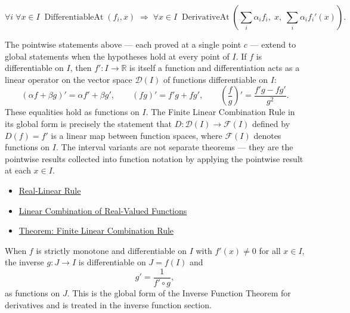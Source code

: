 \begin{remark*}
\[
\forall i\;\forall x\in I\;\operatorname{DifferentiableAt}(f_i,x)
\;\Rightarrow\;
\forall x\in I\;\operatorname{DerivativeAt}\!\left(\textstyle\sum_i\alpha_i f_i,\;x,\;\textstyle\sum_i\alpha_i f_i'(x)\right).
\]
\end{remark*}

\begin{remark*}[Interpretation]
The pointwise statements above --- each proved at a single point $c$ --- extend to global statements when the hypotheses hold at every point of $I$. If $f$ is differentiable on $I$, then $f' : I \to \mathbb{R}$ is itself a function and differentiation acts as a linear operator on the vector space $\mathcal{D}(I)$ of functions differentiable on $I$:
\[
  (\alpha f + \beta g)' = \alpha f' + \beta g',\qquad
  (fg)' = f'g + fg',\qquad
  \left(\frac{f}{g}\right)' = \frac{f'g - fg'}{g^2}.
\]
These equalities hold as functions on $I$. The Finite Linear Combination Rule in its global form is precisely the statement that $D : \mathcal{D}(I) \to \mathcal{F}(I)$ defined by $D(f) = f'$ is a linear map between function spaces, where $\mathcal{F}(I)$ denotes functions on $I$. The interval variants are not separate theorems --- they are the pointwise results collected into function notation by applying the pointwise result at each $x \in I$.
\end{remark*}

\begin{dependencies}
\begin{itemize}
  \item \hyperref[def:real-linear-rule]{Real-Linear Rule}
  \item \hyperref[def:linear-combination-of-real-valued-functions]{Linear Combination of Real-Valued Functions}
  \item \hyperref[thm:finite-linear-combination-rule]{Theorem: Finite Linear Combination Rule}
\end{itemize}
\end{dependencies}


\begin{remark*}
When $f$ is strictly monotone and differentiable on $I$ with $f'(x) \neq 0$ for all $x \in I$, the inverse $g : J \to I$ is differentiable on $J = f(I)$ and
\[
g' = \frac{1}{f' \circ g},
\]
as functions on $J$. This is the global form of the Inverse Function Theorem for derivatives and is treated in the inverse function section.
\end{remark*}
